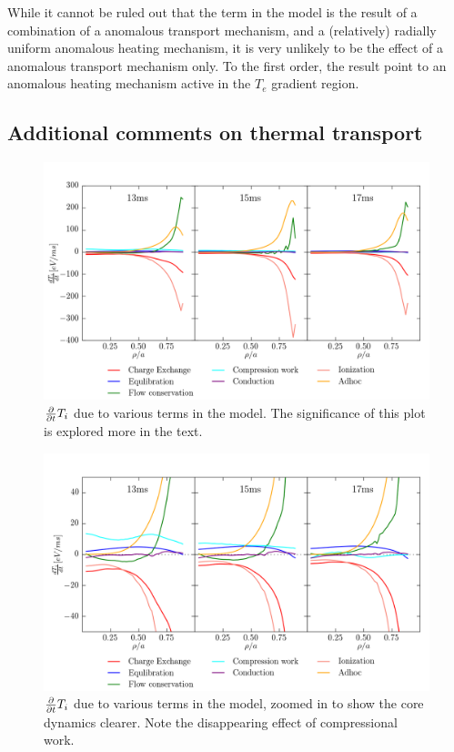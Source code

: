 While it cannot be ruled out that the \adhoc term in the model is the result of a combination of a anomalous transport mechanism, and a (relatively) radially uniform anomalous heating mechanism, it is very unlikely to be the effect of a anomalous transport mechanism only. To the first order, the result point to an anomalous heating mechanism active in the $T_e$ gradient region.

\subsection{Additional comments on thermal transport}

\begin{figure}
    \centering
    \includegraphics[width = \linewidth]{ion_transport_results/dtempdt_with_adhoc.png}
    \caption[$\partialt T_i$ due to various terms]{$\partialt T_i$ due to various terms in the model. The significance of this plot is explored more in the text. }
    \label{fig:temperature_change}
\end{figure}

\begin{figure}
    \centering
    \includegraphics[width = \linewidth]{ion_transport_results/dtempdt_zoomed.png}
    \caption[$\partialt T_i$ core details]{$\partialt T_i$ due to various terms in the model, zoomed in to show the core dynamics clearer. Note the disappearing effect of compressional work. }
    \label{fig:temperature_change_zoomed}
\end{figure}

